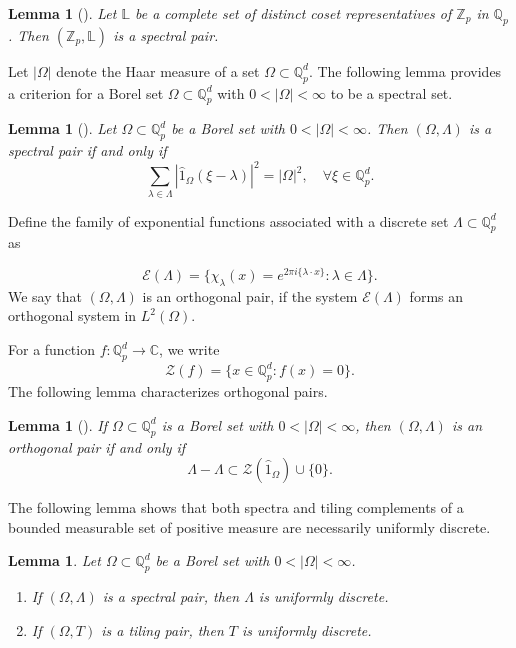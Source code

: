 \documentclass[a4paper,12pt]{amsart}
\newtheorem{lemma}[theorem]{Lemma}
\def\Z{\mathbb{Z}}
\def\Q{\mathbb{Q}}
\def\Qp{\mathbb{Q}_p}
\begin{document}
\begin{lemma}[\cite{Taibleson1975}]\label{lemlattice}
Let $\mathbb{L}$ be a complete set of distinct coset representatives of $\Z_p$ in $\Q_p$.
Then $(\Z_p,\mathbb{L})$ is a spectral pair.
\end{lemma}
Let \(|\Omega|\) denote the Haar measure of a set \(\Omega \subset \Qp^d\).
The following lemma provides a criterion for a Borel set \(\Omega \subset \Qp^d\)
with \(0 < |\Omega| < \infty\) to be a spectral set.
 \begin{lemma}[\cite{Fan}\label{orthogonal}]\label{criterion}
 Let $\Omega\subset\Q_p^d$ be a Borel set with $0<|\Omega|<\infty$. Then
 $(\Omega, \Lambda)$ is a spectral pair  if and only if
  \begin{equation}
 \sum_{\lambda\in\Lambda}|\widehat{1}_{\Omega}(\xi-\lambda)|^2=|\Omega|^2, \quad \forall \xi\in\Q_p^d.
  \end{equation}
 \end{lemma}

Define the family of exponential functions associated with a discrete set $\Lambda\subset\Q_p^d$ as

$$
\mathcal{E}(\Lambda)=\Big\{\chi_\lambda(x)=e^{2\pi i\{\lambda\cdot x\}}: \lambda\in\Lambda\Big\}.
$$
We say that $(\Omega, \Lambda)$ is an orthogonal pair,
if the system  $\mathcal{E}(\Lambda)$ forms an orthogonal system in $L^2(\Omega)$.

For a function $f:\Q_p^d\rightarrow \mathbb{C}$, we write
$$
    \mathcal{Z}(f)=\Big\{x\in\Q_p^d: f(x)=0\Big\}.
$$
The following lemma characterizes orthogonal pairs.
\begin{lemma}[\cite{K2025}\label{orthogonal}]
 If $\Omega\subset\Q_p^d$ is a Borel set with $0<|\Omega|<\infty$, then $(\Omega, \Lambda)$ is an orthogonal pair
 if and only if
  \begin{equation}\label{2.3}
 \Lambda-\Lambda\subset \mathcal{Z}(\widehat{1}_{\Omega})\cup\{0\}.
  \end{equation}
 \end{lemma}


The following lemma shows that both spectra and tiling complements of a bounded measurable
set of positive measure are necessarily uniformly discrete.

\begin{lemma}\label{discretespectra}
 Let $\Omega\subset\mathbb{Q}_{p}^{d}$ be a Borel set with $0<|\Omega|<\infty$.
\begin{enumerate}
\item If $(\Omega,\Lambda)$ is a spectral pair, then $\Lambda$ is uniformly discrete.
\item If $(\Omega,T)$ is a tiling pair, then $T$ is uniformly discrete.
\end{enumerate}
 \end{lemma}
\end{document}
